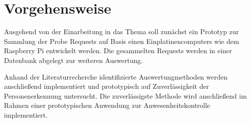 \section{Vorgehensweise}

Ausgehend von der Einarbeitung in das Thema soll zunächst ein Prototyp zur Sammlung der Probe Requests auf Basis einen Einplatinencomputers wie dem Raspberry Pi entwickelt werden.
Die gesammelten Requests werden in einer Datenbank abgelegt zur weiteren Auswertung.

Anhand der Literaturrecherche identifizierte Auswertungmethoden werden anschließend implementiert und prototypisch auf Zuverlässigkeit der Personenerkennung untersucht.
Die zuverlässigste Methode wird anschließend im Rahmen einer prototypischen Anwendung zur Anwesenheitskontrolle implementiert.